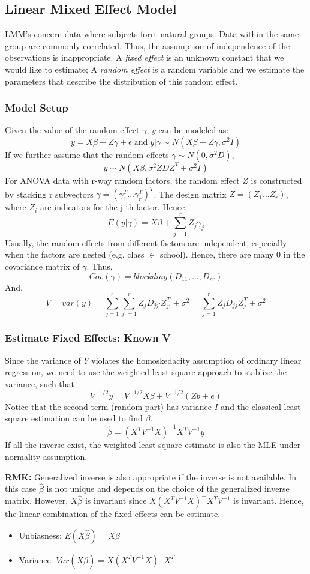 \documentclass[9pt]{article}
\newcommand{\rmk}{\textbf{RMK: }}
\begin{document}
\subsection{Linear Mixed Effect Model}
LMM's concern data where subjects form natural groups.  Data within the same group are commonly correlated. Thus, the assumption of independence of the observations is inappropriate. A \textit{fixed effect} is an unknown constant that we would like to estimate; A \textit{random effect} is a random variable and we estimate the parameters that describe the distribution of this random effect.

\subsubsection{Model Setup}
Given the value of the random effect $\gamma$, $y$ can be modeled as:
$$
y = X\beta + Z\gamma + \epsilon\; \text{and}\; y|\gamma \sim N(X\beta+Z\gamma, \sigma^2I)
$$
If we further assume that the random effects $\gamma \sim N(0, \sigma^2D)$,
$$
    y\sim N(X\beta, \sigma^2ZDZ^T+\sigma^2I)
$$
For ANOVA data with r-way random factors, the random effect $Z$ is constructed by stacking r subvectors $\gamma=(\gamma_1^T...\gamma_r^T)^T$. The design matrix $Z=(Z_1...Z_r)$, where $Z_i$ are indicators for the j-th factor. Hence,
$$
E(y|\gamma) = X\beta + \sum_{j=1}^{r}Z_j\gamma_j
$$
Usually, the random effects from different factors are independent, especially when the factors are nested (e.g. class $\in$ school). Hence, there are many 0 in the covariance matrix of $\gamma$. Thus,
$$
Cov(\gamma) = blockdiag(D_{11},...,D_{rr})
$$
And,
$$
V = var(y) = \sum^{r}_{j=1}\sum^{r}_{j'=1}Z_jD_{jj'}Z^{T}_{j'} + \sigma^2 = \sum^{r}_{j=1}Z_jD_{jj}Z^{T}_{j}+ \sigma^2
$$
\subsubsection{Estimate Fixed Effects: Known V}
Since the variance of $Y$ violates the homoskedacity assumption of ordinary linear regression, we need to use the weighted least square approach to stablize the variance, such that
$$
V^{-1/2}y = V^{-1/2}X\beta + V^{-1/2}(Zb+e)
$$
Notice that the second term (random part) has variance $I$ and the classical least square estimation can be used to find $\beta$.
$$
\hat\beta = (X^TV^{-1}X)^{-1}X^TV^{-1}y
$$
If all the inverse exist, the weighted least square estimate is also the MLE under normality assumption. \par

\rmk Generalized inverse is also appropriate if the inverse is not available. In this case $\hat\beta$ is not unique and depends on the choice of the generalized inverse matrix. However, $X\hat\beta$ is invariant since $X(X^TV^{-1}X)^-X^TV^{-1}$ is invariant. Hence, the linear combination of the fixed effects can be estimate.
\begin{itemize}
    \item Unbiasness: $E(X\hat\beta)=X\beta$
    \item Variance: $Var(X\hat\beta)=X(X^TV^{-1}X)^-X^T$
\end{itemize}
\end{document}
